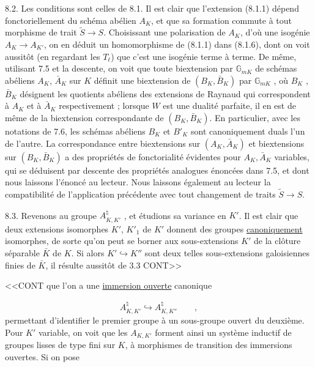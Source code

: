 8.2. Les conditions sont celles de 8.1. Il est clair que l'extension (8.1.1) dépend fonctoriellement du schéma abélien $A_K$, et que sa formation commute à tout morphisme de trait $\tilde{S} \longrightarrow S$. Choisissant une polarisation de $A_K$, d'où une isogénie $A_K \longrightarrow A_{K'}$, on en déduit un homomorphisme de (8.1.1) dans (8.1.6), dont on voit aussitôt (en regardant les $T_\ell$) que c'est une isogénie terme à terme. De même, utilisant 7.5 et la descente, on voit que toute biextension par $\mathbb{G}_{mK}$ de schémas abéliens $A_K$, $\bar{A}_K$ sur $K$ définit une biextension de $(B_K,\bar{B}_K)$ par $\mathbb{G}_{mK}$ , où $B_K$ , $\bar{B}_K$ désignent les quotients abéliens des extensions de Raynaud qui correspondent à $A_K$ et à $\bar{A}_K$ respectivement ; lorsque $W$ est une dualité parfaite, il en est de même de la biextension correspondante de $(B_K,\bar{B}_K)$. En particulier, avec les notations de 7.6, les schémas abéliens $B_K$ et $B'_K$ sont canoniquement duals l'un de l'autre. La correspondance entre biextensions sur $(A_K,\bar{A}_K)$ et biextensions sur $(B_K, \bar{B}_K)$ a des propriétés de fonctorialité évidentes pour $A_K,\bar{A}_K$ variables, qui se déduisent par descente des propriétés analogues énoncées dans 7.5, et dont nous laissons l'énoncé au lecteur. Nous laissons également au lecteur la compatibilité de l'application précédente avec tout changement de traits $\tilde{S} \longrightarrow S$.

8.3. Revenons au groupe $A_{K,K'}^{\natural}$ , et étudions sa variance en $K'$. Il est clair que deux extensions isomorphes $K'$, $K'_1$ de $K'$ donnent des groupes \underline{canoniquement} isomorphes, de sorte qu'on peut se borner aux sous-extensions $K'$ de la clôture séparable $\bar{K}$ de $K$. Si alors $K' \hookrightarrow K''$ sont deux telles sous-extensions galoisiennes finies de $\bar{K}$, il résulte aussitôt de 3.3 CONT>>



<<CONT que l'on a une \underline{immersion ouverte} canonique

\begin{equation}\tag{8.3.1}
A^{\natural}_{K,K'} \hookrightarrow A^{\natural}_{K,K''} \qquad ,
\end{equation}
permettant d'identifier le premier groupe à un sous-groupe ouvert du deuxième. Pour $K'$ variable, on voit que les $A_{K,K'}$ forment ainsi un système inductif de groupes lisses de type fini sur $K$, à morphismes de transition des immersions ouvertes. Si on pose

